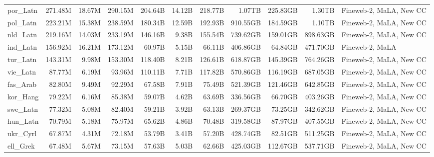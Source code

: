 \begin{table*}[!thp]
{\begin{tabular}{l|rrr|rrr|rrr|l}
por\_Latn                   & 271.48M    & 18.67M       & 290.15M     & 204.64B      & 14.12B         & 218.77B       & 1.07TB     & 225.83GB     & 1.30TB      & Fineweb-2, MaLA, New CC \\
pol\_Latn                   & 223.21M    & 15.38M       & 238.59M     & 180.34B      & 12.59B         & 192.93B       & 910.55GB   & 184.59GB     & 1.10TB      & Fineweb-2, MaLA, New CC \\
nld\_Latn                   & 219.16M    & 14.03M       & 233.19M     & 146.16B      & 9.38B          & 155.54B       & 739.62GB   & 159.01GB     & 898.63GB    & Fineweb-2, MaLA, New CC \\
ind\_Latn                   & 156.92M    & 16.21M       & 173.12M     & 60.97B       & 5.15B          & 66.11B        & 406.86GB   & 64.84GB      & 471.70GB    & Fineweb-2, MaLA         \\
tur\_Latn                   & 143.31M    & 9.98M        & 153.30M     & 118.40B      & 8.21B          & 126.61B       & 618.87GB   & 145.39GB     & 764.26GB    & Fineweb-2, MaLA, New CC \\
vie\_Latn                   & 87.77M     & 6.19M        & 93.96M      & 110.11B      & 7.71B          & 117.82B       & 570.86GB   & 116.19GB     & 687.05GB    & Fineweb-2, MaLA, New CC \\
fas\_Arab                   & 82.80M     & 9.49M        & 92.29M      & 67.58B       & 7.91B          & 75.49B        & 521.39GB   & 121.46GB     & 642.85GB    & Fineweb-2, MaLA, New CC \\
kor\_Hang                   & 79.22M     & 6.16M        & 85.38M      & 59.07B       & 4.62B          & 63.69B        & 336.56GB   & 66.70GB      & 403.26GB    & Fineweb-2, MaLA, New CC \\
swe\_Latn                   & 77.32M     & 5.08M        & 82.40M      & 59.21B       & 3.92B          & 63.13B        & 269.37GB   & 73.25GB      & 342.62GB    & Fineweb-2, MaLA, New CC \\
hun\_Latn                   & 70.79M     & 5.18M        & 75.97M      & 65.62B       & 4.86B          & 70.48B        & 319.58GB   & 87.97GB      & 407.55GB    & Fineweb-2, MaLA, New CC \\
ukr\_Cyrl                   & 67.87M     & 4.31M        & 72.18M      & 53.79B       & 3.41B          & 57.20B        & 428.74GB   & 82.51GB      & 511.25GB    & Fineweb-2, MaLA, New CC \\
ell\_Grek                   & 67.48M     & 5.67M        & 73.15M      & 57.63B       & 5.03B          & 62.66B        & 425.03GB   & 112.67GB     & 537.71GB    & Fineweb-2, MaLA, New CC \\

\end{tabular}}
\end{table*}
